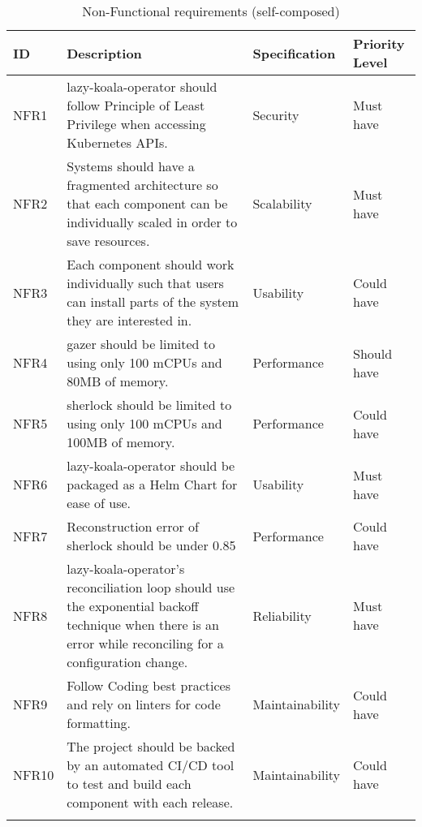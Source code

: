 \begin{longtable}{|p{13mm}|p{89mm}|p{26mm}|p{18mm}|}
\hline
    \textbf{ID} &
    \textbf{Description} &
    \textbf{Specification} &
    \textbf{Priority Level} \\ \hline
    
    NFR1 &
    \ac{lazy-koala-operator} should follow Principle of Least Privilege when accessing Kubernetes APIs. &
    Security &
    Must have \\ \hline
    
    NFR2 &
    Systems should have a fragmented architecture so that each component can be individually scaled in order to save resources. &
    Scalability &
    Must have \\ \hline
    
    NFR3 &
    Each component should work individually such that users can install parts of the system they are interested in. &
    Usability &
    Could have \\ \hline
    
    NFR4 &
    \ac{gazer} should be limited to using only 100 mCPUs and 80MB of memory. &
    Performance &
    Should have \\ \hline
    
    NFR5 &
    \ac{sherlock} should be limited to using only 100 mCPUs and 100MB of memory. &
    Performance &
    Could have \\ \hline
    
    NFR6 &
    \ac{lazy-koala-operator} should be packaged as a Helm Chart for ease of use. &
    Usability &
    Must have \\ \hline
    
    NFR7 &
    Reconstruction error of \ac{sherlock} should be under 0.85 &
    Performance &
    Could have \\ \hline
    
    NFR8 &
    \ac{lazy-koala-operator}’s reconciliation loop should use the exponential backoff technique when there is an error while reconciling for a configuration change. &
    Reliability &
    Must have \\ \hline
    
    NFR9 &
    Follow Coding best practices and rely on linters for code formatting. &
    Maintainability &
    Could have \\ \hline
    
    NFR10 &
    The project should be backed by an automated CI/CD tool to test and build each component with each release. &
    Maintainability &
    Could have \\ \hline

\caption{Non-Functional requirements (self-composed)}
\end{longtable}